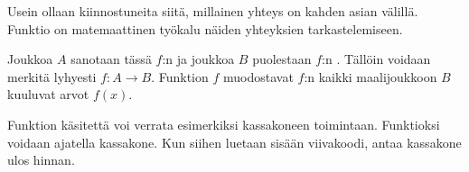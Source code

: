 Usein ollaan kiinnostuneita siitä, millainen yhteys on kahden asian välillä.
Funktio on matemaattinen työkalu näiden yhteyksien tarkastelemiseen.

  
  Joukkoa $A$ sanotaan tässä $f$:n  ja joukkoa $B$ puolestaan $f$:n . Tällöin voidaan merkitä lyhyesti $f\colon A \to B$. Funktion $f$  muodostavat $f$:n kaikki maalijoukkoon $B$ kuuluvat arvot $f(x)$.
   
  
Funktion käsitettä voi verrata esimerkiksi kassakoneen toimintaan. Funktioksi voidaan ajatella kassakone. Kun siihen luetaan sisään viivakoodi, antaa kassakone ulos hinnan.

